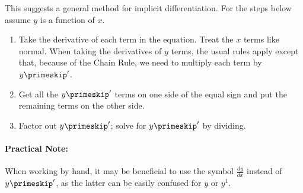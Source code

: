 This suggests a general method for implicit differentiation.  For the steps below assume $y$ is a function of $x$.
\begin{enumerate}
\item Take the derivative of each term in the equation.  Treat the $x$ terms like normal.  When taking the derivatives of $y$ terms, the usual rules apply except that, because of the Chain Rule, we need to multiply each term by $y\primeskip'$.
\item Get all the $y\primeskip'$ terms on one side of the equal sign and put the remaining terms on the other side.
\item Factor out $y\primeskip'$;  solve for $y\primeskip'$ by dividing.
\end{enumerate}

\paragraph{Practical Note:}When working by hand, it may be beneficial to use the symbol $\frac{dy}{dx}$ instead of $y\primeskip'$, as the latter can be easily confused for $y$ or $y^1$.

